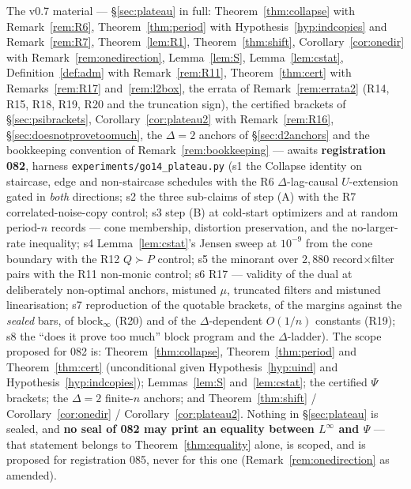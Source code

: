 \documentclass[11pt]{article}
\theoremstyle{definition}
\theoremstyle{remark}
\begin{document}
The v0.7 material --- \S\ref{sec:plateau} in full:
Theorem~\ref{thm:collapse} with Remark~\ref{rem:R6},
Theorem~\ref{thm:period} with Hypothesis~\ref{hyp:indcopies} and
Remark~\ref{rem:R7}, Theorem~\ref{lem:R1}, Theorem~\ref{thm:shift},
Corollary~\ref{cor:onedir} with Remark~\ref{rem:onedirection},
Lemma~\ref{lem:S}, Lemma~\ref{lem:cstat}, Definition~\ref{def:adm}
with Remark~\ref{rem:R11}, Theorem~\ref{thm:cert} with
Remarks~\ref{rem:R17} and~\ref{rem:l2box}, the errata of
Remark~\ref{rem:errata2} (R14, R15, R18, R19, R20 and the truncation
sign), the certified brackets of \S\ref{sec:psibrackets},
Corollary~\ref{cor:plateau2} with Remark~\ref{rem:R16},
\S\ref{sec:doesnotprovetoomuch}, the $\Delta=2$ anchors of
\S\ref{sec:d2anchors} and the bookkeeping convention of
Remark~\ref{rem:bookkeeping} --- awaits \textbf{registration 082},
harness \texttt{experiments/go14\_plateau.py} (s1 the Collapse
identity on staircase, edge and non-staircase schedules with the R6
$\Delta$-lag-causal $U$-extension gated in \emph{both} directions;
s2 the three sub-claims of step (A) with the R7 correlated-noise-copy
control; s3 step (B) at cold-start optimizers and at random period-$n$
records --- cone membership, distortion preservation, and the
no-larger-rate inequality; s4 Lemma~\ref{lem:cstat}'s Jensen sweep at
$10^{-9}$ from the cone boundary with the R12 $Q\succ P$ control; s5
the minorant over $2{,}880$ record$\times$filter pairs with the R11
non-monic control; s6 R17 --- validity of the dual at deliberately
non-optimal anchors, mistuned $\mu$, truncated filters and mistuned
linearisation; s7 reproduction of the quotable brackets, of the
margins against the \emph{sealed} bars, of $\mathrm{block}_\infty$
(R20) and of the $\Delta$-dependent $O(1/n)$ constants (R19); s8 the
``does it prove too much'' block program and the $\Delta$-ladder).
The scope proposed for 082 is: Theorem~\ref{thm:collapse},
Theorem~\ref{thm:period} and Theorem~\ref{thm:cert}
(unconditional given Hypothesis~\ref{hyp:uind} and
Hypothesis~\ref{hyp:indcopies}); Lemmas~\ref{lem:S}
and~\ref{lem:cstat}; the certified $\Psi$ brackets; the $\Delta=2$
finite-$n$ anchors; and Theorem~\ref{thm:shift} /
Corollary~\ref{cor:onedir} / Corollary~\ref{cor:plateau2}. Nothing in
\S\ref{sec:plateau} is sealed, and \textbf{no seal of 082 may print an
equality between $L^\infty$ and $\Psi$} --- that statement belongs to
Theorem~\ref{thm:equality} alone, is scoped, and is proposed for
registration 085, never for this one (Remark~\ref{rem:onedirection} as
amended).
\end{document}
